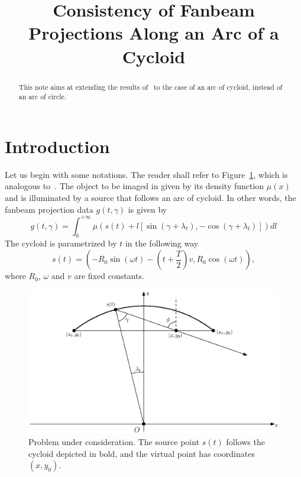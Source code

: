 \documentclass[a4paper]{article}
\title{Consistency of Fanbeam Projections Along an Arc of a Cycloid}
\author{}
\date{}
\numberwithin{equation}{section}
\begin{document}
\maketitle

\begin{abstract}
This note aims at extending the results of~\cite{clackdoyle2015consistency} to the case of an arc of cycloid, instead of an arc of circle.
\end{abstract}

\section{Introduction}

Let us begin with some notations. The reader shall refer to Figure~\ref{fig:notations}, which is analogous to~\cite[Figure~2]{clackdoyle2015consistency}. The object to be imaged in given by its density function $\mu(x)$ and is illuminated by a source that follows an arc of cycloid. In other words, the fanbeam projection data $g(t,\gamma)$ is given by
\begin{equation}
	g(t,\gamma) = \int_0^{+\infty} \mu \left( s(t) + l \left[ \sin (\gamma + \lambda_t), -\cos (\gamma + \lambda_t) \right] \right) dl
\end{equation}
The cycloid is parametrized by $t$ in the following way
$$
s(t) = \left( -R_0 \sin(\omega t) - \left( t + \frac{T}{2} \right) v, R_0 \cos(\omega t) \right),
$$
where $R_0$, $\omega$ and $v$ are fixed constants.
\begin{figure}[!ht]
	\centering
	\includegraphics[width=13cm]{figure.eps}
	\caption{Problem under consideration. The source point $s(t)$ follows the cycloid depicted in bold, and the virtual point has coordinates $(x,y_0)$.\label{fig:notations}}
\end{figure}
\end{document}

